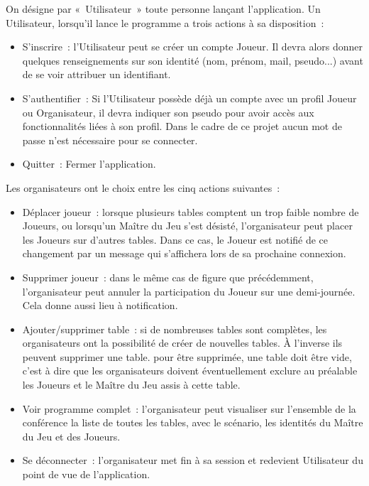 \documentclass[11pt]{article}
\begin{document}
On désigne par «~Utilisateur~» toute personne lançant l'application. Un Utilisateur, lorsqu'il lance le programme a trois actions à sa disposition~:
\begin{itemize}
    \item{S'inscrire~: l'Utilisateur peut se créer un compte Joueur. Il devra alors donner quelques renseignements sur son identité (nom, prénom, mail, pseudo...) avant de se voir attribuer un identifiant.}
    \item{S'authentifier~: Si l'Utilisateur possède déjà un compte avec un profil Joueur ou Organisateur, il devra indiquer son pseudo pour avoir accès aux fonctionnalités liées à son profil. Dans le cadre de ce projet aucun mot de passe n'est nécessaire pour se connecter.}
    \item{Quitter~:  Fermer l'application.\\}
\end{itemize}

Les organisateurs ont le choix entre les cinq actions suivantes~:
\begin{itemize}
    \item {Déplacer joueur~: lorsque plusieurs tables comptent un trop faible nombre de Joueurs, ou lorsqu'un Maître du Jeu s'est désisté, l'organisateur peut placer les Joueurs sur d'autres tables. Dans ce cas, le Joueur est notifié de ce changement par un message qui s'affichera lors de sa prochaine connexion.}
    \item{Supprimer joueur~: dans le même cas de figure que précédemment, l'organisateur peut annuler la participation du Joueur sur une demi-journée. Cela donne aussi lieu à notification.}
    \item{Ajouter/supprimer table~: si de nombreuses tables sont complètes, les organisateurs ont la possibilité de créer de nouvelles tables. À l'inverse ils peuvent supprimer une table. pour être supprimée, une table doit être vide, c'est à dire que les organisateurs doivent éventuellement exclure au préalable les Joueurs et le Maître du Jeu assis à cette table.}
    \item{Voir programme complet~: l'organisateur peut visualiser sur l'ensemble de la conférence la liste de toutes les tables, avec le scénario, les identités du Maître du Jeu et des Joueurs.}
    \item{Se déconnecter~: l'organisateur met fin à sa session et redevient Utilisateur du point de vue de l'application.\\}
\end{itemize}
\end{document}

